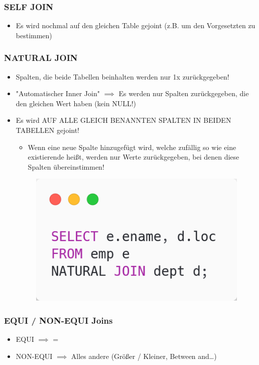 \subsubsection{SELF JOIN}
\begin{itemize}
    \item Es wird nochmal auf den gleichen Table gejoint (z.B. um den Vorgesetzten zu bestimmen)
\end{itemize}

\subsubsection{NATURAL JOIN}
\begin{itemize}
    \item Spalten, die beide Tabellen beinhalten werden nur 1x zurückgegeben!
    \item "Automatischer Inner Join" $\implies$ Es werden nur Spalten zurückgegeben, die den gleichen Wert haben (kein NULL!)
    \item Es wird AUF ALLE GLEICH BENANNTEN SPALTEN IN BEIDEN TABELLEN gejoint!
    \begin{itemize}
        \item Wenn eine neue Spalte hinzugefügt wird, welche zufällig so wie eine existierende heißt, werden nur Werte zurückgegeben, bei denen diese Spalten übereinstimmen!
    \end{itemize}
    \begin{figure}[H]
        \centering
        \includegraphics[scale=.4]{res/themekorb_2/natural_join.png} 
    \end{figure}
\end{itemize}

\subsubsection{EQUI / NON-EQUI Joins}
\begin{itemize}
    \item EQUI $\implies$ =
    \item NON-EQUI $\implies$ Alles andere (Größer / Kleiner, Between and\dots)
\end{itemize}

